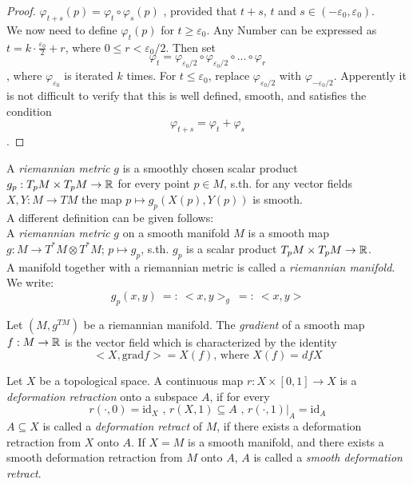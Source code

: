 \begin{proof}
   $\varphi_{t+s}(p) = \varphi_t \circ \varphi_s (p)$ , provided that $t+s$, $t$
   and $s \in (-\varepsilon_0, \varepsilon_0)$. \\ 
   We now need to define $\varphi_t(p)$ for $t \geq \varepsilon_0$. Any Number 
   can be expressed as $t = k \cdot \frac{\varepsilon_0}{2} + r$, where 
   $0 \leq r < \varepsilon_0/2$. Then set 
   \[ \varphi_t = 
   \varphi_{\varepsilon_0/2} \circ \varphi_{\varepsilon_0/2} \circ ... \circ \varphi_r \]
   , where $\varphi_{\varepsilon_0}$ is iterated $k$ times. For 
   $t \leq \varepsilon_0$, replace $\varphi_{\varepsilon_0/2}$ with 
   $\varphi_{-\varepsilon_0/2}$. 
   Apperently it is not difficult to verify that this is well defined, smooth,
   and satisfies the condition \[\varphi_{t+s} = \varphi_t + \varphi_s\].
\end{proof}

\begin{definition}
   \label{def:riemannian metric}
   A \textit{riemannian metric} $g$ is a smoothly chosen scalar product 
   $g_p: T_pM \times T_pM \rightarrow {\mathbb R}$ for every point $p \in M$, s.th. for 
   any vector fields $ X, Y: M \rightarrow TM $ the map 
   $ p \mapsto g_p(X(p), Y(p)) $ is smooth. \\
   A different definition can be given follows: \\
   A \textit{riemannian metric} $g$ on a smooth manifold $M$ is a smooth map 
   $g: M \rightarrow T^*M \otimes T^*M$; $p \mapsto g_p$,
   s.th. $g_p$ is a scalar product $T_pM \times T_pM \rightarrow {\mathbb R}$. \\
   A manifold together with a riemannian metric is called a 
   \textit{riemannian manifold}. \\
   We write:
   \[ g_p(x,y) \: =: \: <x, y>_g \: =: \: <x, y> \]
\end{definition}

\begin{definition}[gradient]
   \label{def:gradient}
   Let $(M, g^{TM})$ be a riemannian manifold. The \textit{gradient} of a smooth 
   map $f: M \rightarrow {\mathbb R}$ is the vector field which is characterized by the 
   identity 
   \[ <X, \text{grad} f> = X(f) \text{, where } X(f) = dfX \]
\end{definition}

\begin{definition}
   \label{def:deformation retract}
   Let $X$ be a topological space. A continuous map $r: X \times [0, 1] \rightarrow X$ is 
   a \textit{deformation retraction} onto a subspace $A$, if for every 
   \[ r(\cdot,0) = \text{id}_X \text{ , } r(X, 1) \subseteq A \text{ , } r(\cdot, 1)|_A = \text{id}_A\]
   $A \subseteq X$ is called a \textit{deformation retract} of $M$, if there exists a
   deformation retraction from $X$ onto $A$.
   If $X = M$ is a smooth manifold, and there exists a smooth deformation
   retraction from $M$ onto $A$, $A$ is called a \textit{smooth deformation 
   retract}.
\end{definition}

